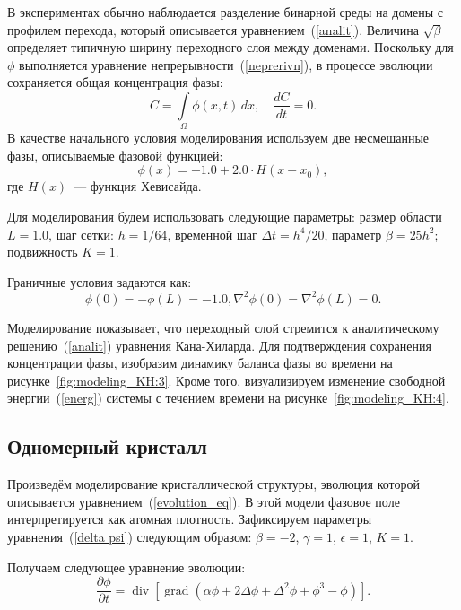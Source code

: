 В экспериментах обычно наблюдается разделение бинарной среды на домены с профилем перехода, который описывается уравнением~(\ref{analit}). Величина $\sqrt{\beta}$ определяет типичную ширину переходного слоя между доменами.
Поскольку для $\phi$ выполняется уравнение непрерывности~(\ref{neprerivn}), в процессе эволюции сохраняется общая концентрация фазы:
\begin{equation*}
    C = \int \limits_{\Omega} \phi(x, t) \, dx, \quad \frac{dC}{dt} = 0.
\end{equation*}
В качестве начального условия моделирования используем две несмешанные фазы, описываемые фазовой функцией:
\begin{equation*}
    \phi(x) = -1.0 + 2.0 \cdot H(x - x_0),
\end{equation*}
где $H(x)$~--- функция Хевисайда.

Для моделирования будем использовать следующие параметры: размер области $L = 1.0$, шаг сетки: $ h = 1 / 64$, временной шаг $\Delta t = h^4 / 20$, параметр $\beta = 25h^2$; подвижность $K = 1$.

Граничные условия задаются как:
\begin{equation*}
\phi(0) = -\phi(L) = -1.0, \nabla^2\phi(0) = \nabla^2\phi(L) = 0.
\end{equation*}

Моделирование показывает, что переходный слой стремится к аналитическому решению~(\ref{analit}) уравнения Кана-Хиларда.
Для подтверждения сохранения концентрации фазы, изобразим динамику баланса фазы во времени на рисунке~\ref{fig:modeling_KH:3}. Кроме того, визуализируем изменение свободной энергии~(\ref{energ}) системы с течением времени на рисунке~\ref{fig:modeling_KH:4}.


\subsection{Одномерный кристалл}
Произведём моделирование кристаллической структуры, эволюция которой описывается уравнением~(\ref{evolution_eq}). В этой модели фазовое поле интерпретируется как атомная плотность.
Зафиксируем параметры уравнения~(\ref{delta psi}) следующим образом: $\beta = -2$, $\gamma = 1$, $\epsilon = 1$, $K = 1$.

Получаем следующее уравнение эволюции:
\begin{equation*}
    \frac{\partial \phi}{\partial t} = \operatorname{div}\left[\operatorname{grad} \left(
    \alpha \phi + 2 \Delta \phi + \Delta^2 \phi +
    \phi^3 - \phi\right)\right].
\end{equation*}

